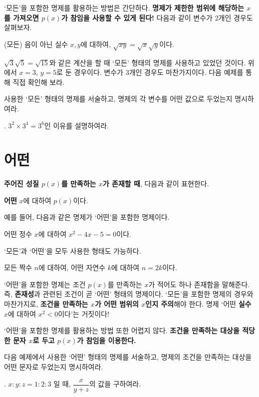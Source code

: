 `모든'을 포함한 명제를 활용하는 방법은 간단하다. \textbf{명제가 제한한 범위에 해당하는 \(x\)를 가져오면 \(p(x)\)가 참임을 사용할 수 있게 된다!} 다음과 같이 변수가 2개인 경우도 살펴보자.
\begin{center}
    (모든) 음이 아닌 실수 \(x, y\)에 대하여, \(\sqrt{xy} = \sqrt{x}\sqrt{y}\)이다.
\end{center}
\(\sqrt{3}\sqrt{5} = \sqrt{15}\)와 같은 계산을 할 때 `모든' 형태의 명제를 사용하고 있었던 것이다. 위에서 \(x = 3\), \(y = 5\)로 둔 경우이다. 변수가 3개인 경우도 마찬가지이다. 다음 예제를 통해 직접 확인해 보라.

사용한 `모든' 형태의 명제를 서술하고, 명제의 각 변수를 어떤 값으로 두었는지 명시하여라.

\bigskip

\ex. \(3^2 \times 3^4 = 3^6\)인 이유를 설명하여라.

\pagebreak

\section{어떤}

\textbf{주어진 성질 \(p(x)\)를 만족하는 \(x\)가 존재할 때}, 다음과 같이 표현한다.
\begin{center}
    \textbf{어떤} \(x\)에 대하여 \(p(x)\)이다.
\end{center}
예를 들어, 다음과 같은 명제가 `어떤'을 포함한 명제이다.
\begin{center}
    어떤 정수 \(x\)에 대하여 \(x^2 - 4x - 5 = 0\)이다.
\end{center}
`모든'과 `어떤'을 모두 사용한 형태도 가능하다.
\begin{center}
    모든 짝수 \(n\)에 대하여, 어떤 자연수 \(k\)에 대하여 \(n = 2k\)이다.
\end{center}

`어떤'을 포함한 명제는 조건 \(p(x)\)를 만족하는 \(x\)가 적어도 하나 존재함을 말해준다. 즉, \textbf{존재성}과 관련된 조건이 곧 `어떤' 형태의 명제이다. `모든'을 포함한 명제의 경우와 마찬가지로, \textbf{조건을 만족하는 \(x\)가 어떤 범위의 \(x\)인지 주의}해야 한다. 명제 `어떤 \textbf{실수} \(x\)에 대하여 \(x^2 < 0\)이다'는 거짓이다!

`어떤'을 포함한 명제를 활용하는 방법 또한 어렵지 않다. \textbf{조건을 만족하는 대상을 적당한 문자 \(x\)로 두고 \(p(x)\)가 참임을 이용한다.}

다음 예제에서 사용한 `어떤' 형태의 명제를 서술하고, 명제의 조건을 만족하는 대상을 어떤 문자로 두었는지 명시하여라.

\bigskip

\ex. \(x : y : z = 1 : 2 : 3\) 일 때, \(\dfrac{x}{y + z}\)의 값을 구하여라.

\pagebreak
